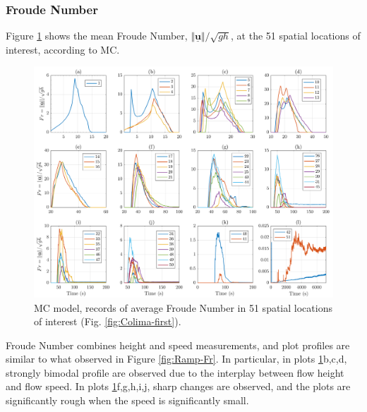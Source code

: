 \documentclass{article}
\begin{document}
\subsubsection{Froude Number}
Figure \ref{fig:BAF-Fr-MC} shows the mean Froude Number, $\Vert \underline{\mathbf{u}} \Vert/\sqrt{gh}$, at the 51 spatial locations of interest, according to MC.
\begin{figure}[H]
         \centering
        \includegraphics[width=1\textwidth]{MC&VS_51/Froude_MC2.png}
        \caption{MC model, records of average Froude Number in 51 spatial locations of interest (Fig. \ref{fig:Colima-first}).}
        \label{fig:BAF-Fr-MC}
\end{figure}
Froude Number combines height and speed measurements, and plot profiles are similar to what observed in Figure \ref{fig:Ramp-Fr}. In particular, in plots \ref{fig:BAF-Fr-MC}b,c,d, strongly bimodal profile are observed due to the interplay between flow height and flow speed. In plots \ref{fig:BAF-Fr-MC}f,g,h,i,j, sharp changes are observed, and the plots are significantly rough when the speed is significantly small.
\end{document}
